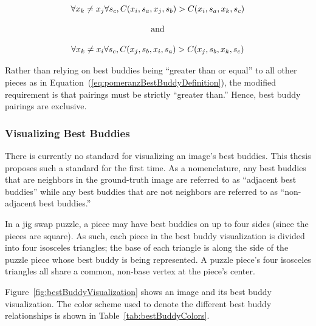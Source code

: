 \documentclass{report}
\def\eref#1{(\ref{#1})}
\begin{document}
\begin{equation} \label{eq:hammoudehBestBuddyDefinition}
\centering
\begin{split}
	\begin{matrix}
		\forall{x_{k} \ne x_{j}}\forall{s_c},C(x_i, s_a, x_j, s_b) > C(x_i, s_a, x_k, s_c)
		\\
		\\
		\textnormal{and}
		\\
		\\
		\forall{x_{k} \ne x_{i}}\forall{s_c},C(x_j, s_b, x_i, s_a) > C(x_j, s_b, x_k, s_c)
	\end{matrix}
\end{split}
\end{equation}

Rather than relying on best buddies being ``greater than or equal'' to all other pieces as in Equation~\eref{eq:pomeranzBestBuddyDefinition}, the modified requirement is that pairings must be strictly ``greater than.''  Hence, best buddy pairings are exclusive.

\subsubsection{Visualizing Best Buddies}\label{sec:visualizingBestBuddies}

There is currently no standard for visualizing an image's best buddies.  This thesis proposes such a standard for the first time.  As a nomenclature, any best buddies that are neighbors in the ground-truth image are referred to as ``adjacent best buddies'' while any best buddies that are not neighbors are referred to as ``non-adjacent best buddies.''

In a jig swap puzzle, a piece may have best buddies on up to four sides (since the pieces are square).  As such, each piece in the best buddy visualization is divided into four isosceles triangles; the base of each triangle is along the side of the puzzle piece whose best buddy is being represented.  A puzzle piece's four isosceles triangles all share a common, non-base vertex at the piece's center.  

Figure~\ref{fig:bestBuddyVisualization} shows an image and its best buddy visualization.  The color scheme used to denote the different best buddy relationships is shown in Table~\ref{tab:bestBuddyColors}.
\end{document}
